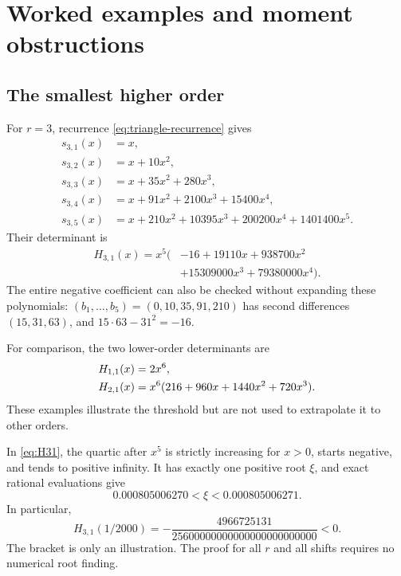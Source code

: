 \documentclass[11pt,a4paper]{article}
\theoremstyle{definition}
\numberwithin{equation}{section}
\begin{document}
\section{Worked examples and moment obstructions}
\label{sec:examples}

\subsection{The smallest higher order}

For $r=3$, recurrence \eqref{eq:triangle-recurrence} gives
\begin{align*}
 s_{3,1}(x)&=x,\\
 s_{3,2}(x)&=x+10x^2,\\
 s_{3,3}(x)&=x+35x^2+280x^3,\\
 s_{3,4}(x)&=x+91x^2+2100x^3+15400x^4,\\
 s_{3,5}(x)&=x+210x^2+10395x^3+200200x^4+1401400x^5.
\end{align*}
Their determinant is
\begin{equation}
 \begin{split}
 H_{3,1}(x)=x^5\bigl(&-16+19110x+938700x^2\\
                    &+15309000x^3+79380000x^4\bigr).
 \end{split}
 \label{eq:H31}
\end{equation}
The entire negative coefficient can also be checked without expanding
these polynomials: $(b_1,\ldots,b_5)=(0,10,35,91,210)$ has second
differences $(15,31,63)$, and $15\cdot63-31^2=-16$.

For comparison, the two lower-order determinants are
\begin{align}
 H_{1,1}(x)&=2x^6,\notag\\
 H_{2,1}(x)&=x^6(216+960x+1440x^2+720x^3).
 \label{eq:low-order-H}
\end{align}
These examples illustrate the threshold but are not used to extrapolate
it to other orders.

In \eqref{eq:H31}, the quartic after $x^5$ is strictly increasing for
$x>0$, starts negative, and tends to positive infinity. It has exactly
one positive root $\xi$, and exact rational evaluations give
\begin{equation}
 0.000805006270<\xi<0.000805006271.
 \label{eq:root-bracket}
\end{equation}
In particular,
\begin{equation}
 H_{3,1}(1/2000)=
 -\frac{4966725131}{25600000000000000000000000}<0.
 \label{eq:scalar-example}
\end{equation}
The bracket is only an illustration. The proof for all $r$ and all shifts
requires no numerical root finding.
\end{document}
